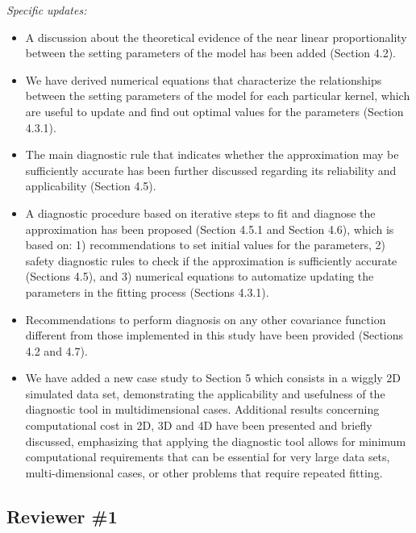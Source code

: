 \documentclass[11pt]{report}
\begin{document}
\noindent \textit{Specific updates:}

\begin{itemize}

\item A discussion about the theoretical evidence of the near linear proportionality between the setting parameters of the model has been added (Section 4.2). 

\item We have derived numerical equations that characterize the relationships between the setting parameters of the model for each particular kernel, which are useful to update and find out optimal values for the parameters (Section 4.3.1). 

\item The main diagnostic rule that indicates whether the approximation may be sufficiently accurate has been further discussed regarding its reliability and applicability (Section 4.5).

\item A diagnostic procedure based on iterative steps to fit and diagnose the approximation has been proposed (Section 4.5.1 and Section 4.6), which is based on: 1) recommendations to set initial values for the parameters, 2) safety diagnostic rules to check if the approximation is sufficiently accurate (Sections 4.5), and 3) numerical equations to automatize updating the parameters in the fitting process (Sections 4.3.1).

\item Recommendations to perform diagnosis on any other covariance function different from those implemented in this study have been provided (Sections 4.2 and 4.7).

\item We have added a new case study to Section 5 which consists in a wiggly 2D simulated data set, demonstrating the applicability and usefulness of the diagnostic tool in multidimensional cases. Additional results concerning computational cost in 2D, 3D and 4D have been presented and briefly discussed, emphasizing that applying the diagnostic tool allows for minimum computational requirements that can be essential for very large data sets, multi-dimensional cases, or other problems that require repeated fitting.

\end{itemize}

\noindent \hdashrule{12.5cm}{0.2pt}{2mm 1pt}

\subsection*{Reviewer \#1}
\end{document}
